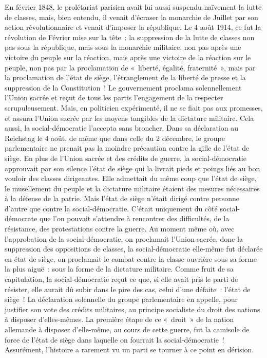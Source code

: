 \documentclass[french,twoside]{book} %
\begin{document}
\noindent En février 1848, le prolétariat parisien avait lui aussi suspendu naïvement la lutte de classes, mais, bien entendu, il venait d’écraser la monarchie de Juillet par son action révolutionnaire et venait d’imposer la république. Le 4 août 1914, ce fut la révolution de Février mise sur la tête : la suppression de la lutte de classes non pas sous la république, mais sous la monarchie militaire, non pas après une victoire du peuple sur la réaction, mais après une victoire de la réaction sur le peuple, non pas par la proclamation de « liberté, égalité, fraternité », mais par la proclamation de l’état de siège, l’étranglement de la liberté de presse et la suppression de la Constitution ! Le gouvernement proclama solennellement l’Union sacrée et reçut de tous les partis l’engagement de la respecter scrupuleusement. Mais, en politicien expérimenté, il ne se fiait pas  aux promesses, et assura l’Union sacrée par les moyens tangibles de la dictature militaire. Cela aussi, la social-démocratie l’accepta sans broncher. Dans sa déclaration au Reichstag le 4 août, de même que dans celle du 2 décembre, le groupe parlementaire ne prenait pas la moindre précaution contre la gifle de l’état de siège. En plus de l’Union sacrée et des crédits de guerre, la social-démocratie approuvait par son silence l’état de siège qui la livrait pieds et poings liés au bon vouloir des classes dirigeantes. Elle admettait du même coup que l’état de siège, le musellement du peuple et la dictature militaire étaient des mesures nécessaires à la défense de la patrie. Mais l’état de siège n’était dirigé contre personne d’autre que contre la social-démocratie. C'était uniquement du côté social-démocrate que l’on pouvait s’attendre à rencontrer des difficultés, de la résistance, des protestations contre la guerre. Au moment même où, avec l’approbation de la social-démocratie, on proclamait l’Union sacrée, donc la suppression des oppositions de classes, la social-démocratie elle-même fut déclarée en état de siège, on proclamait le combat contre la classe ouvrière sous sa forme la plus aiguë : sous la forme de la dictature militaire. Comme fruit de sa capitulation, la social-démocratie reçut ce que, si elle avait pris le parti de résister, elle aurait dû subir dans le pire des cas, celui d’une défaite : l’état de siège ! La déclaration solennelle du groupe parlementaire en appelle, pour justifier son vote des crédits militaires, au principe socialiste du droit des nations à disposer d’elles-mêmes. La première étape de ce « droit » de la nation allemande à disposer d’elle-même, au cours de cette guerre, fut la camisole de force de l’état de siège dans laquelle on fourrait la social-démocratie ! Assurément, l’histoire a rarement vu un parti se tourner à ce point en dérision.\par
\end{document}
